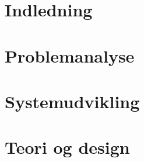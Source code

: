 



\chapter{Indledning}\label{Indledning}



\chapter{Problemanalyse}


 


\chapter{Systemudvikling} 

%
%

\chapter{Teori og design}









